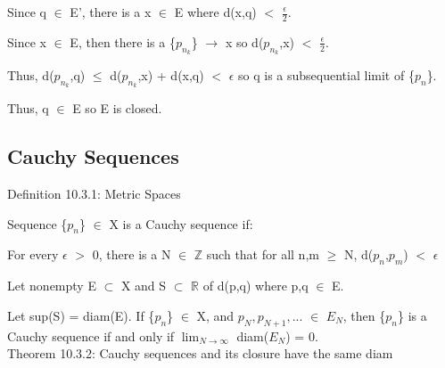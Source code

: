     Since q $\in$ E', there is a x $\in$ E where d(x,q) $<$ $\frac{\epsilon}{2}$.

    Since x $\in$ E, then there is a \{$p_{n_k}$\} $\rightarrow$ x
    so d($p_{n_k}$,x) $<$ $\frac{\epsilon}{2}$.

    Thus, d($p_{n_k}$,q) $\leq$ d($p_{n_k}$,x) + d(x,q) $<$ $\epsilon$
    so q is a subsequential limit of \{$p_n$\}.
    
    Thus, q $\in$ E so E is closed. \\

\newpage





\subsection{Cauchy Sequences}

{ \color{blue} Definition 10.3.1: Metric Spaces } 

	\begin{adjustbox}{minipage=14cm, right, vspace=0.1cm 0cm}
        Sequence \{$p_n$\} $\in$ X is a Cauchy sequence if:

        \hspace{0.5cm}
        For every $\epsilon$ $>$ 0, there is a N $\in$ $\mathbb{Z}$ such that
        for all n,m $\geq$ N, d($p_n$,$p_m$) $<$ $\epsilon$

        Let nonempty E $\subset$ X and S $\subset$ $\mathbb{R}$ of 
        d(p,q) where p,q $\in$ E.
        
        Let sup(S) = diam(E).
        If \{$p_n$\} $\in$ X, and $p_N, p_{N+1}, ... $ $\in$ $E_N$, then
        \{$p_n$\} is a Cauchy sequence if and only if
        $\lim_{N \rightarrow \infty}$ diam($E_N$) = 0. \\
    \end{adjustbox}

{ \color{red} Theorem 10.3.2: Cauchy sequences and its closure have the same diam }

